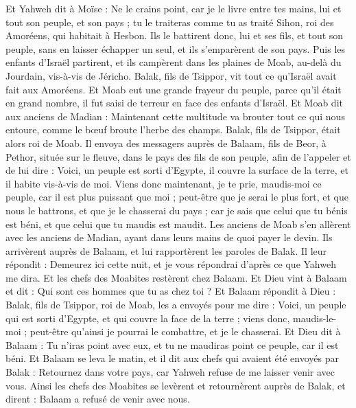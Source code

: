 \begin{multicols}{2}
Et Yahweh dit à Moïse : Ne le crains point, car je le livre entre tes mains, lui et tout son peuple, et son pays ; tu le traiteras comme tu as traité Sihon, roi des Amoréens, qui habitait à Hesbon.
Ils le battirent donc, lui et ses fils, et tout son peuple, sans en laisser échapper un seul, et ils s'emparèrent de son pays.
\VerseOne{}Puis les enfants d'Israël partirent, et ils campèrent dans les plaines de Moab, au-delà du Jourdain, vis-à-vis de Jéricho.
Balak, fils de Tsippor, vit tout ce qu'Israël avait fait aux Amoréens.
Et Moab eut une grande frayeur du peuple, parce qu'il était en grand nombre, il fut saisi de terreur en face des enfants d'Israël.
Et Moab dit aux anciens de Madian : Maintenant cette multitude va brouter tout ce qui nous entoure, comme le bœuf broute l'herbe des champs. Balak, fils de Tsippor, était alors roi de Moab.
Il envoya des messagers auprès de Balaam, fils de Beor, à Pethor, située sur le fleuve, dans le pays des fils de son peuple, afin de l'appeler et de lui dire : Voici, un peuple est sorti d'Egypte, il couvre la surface de la terre, et il habite vis-à-vis de moi.
Viens donc maintenant, je te prie, maudis-moi ce peuple, car il est plus puissant que moi ; peut-être que je serai le plus fort, et que nous le battrons, et que je le chasserai du pays ; car je sais que celui que tu bénis est béni, et que celui que tu maudis est maudit.
Les anciens de Moab s'en allèrent avec les anciens de Madian, ayant dans leurs mains de quoi payer le devin. Ils arrivèrent auprès de Balaam, et lui rapportèrent les paroles de Balak.
Il leur répondit : Demeurez ici cette nuit, et je vous répondrai d'après ce que Yahweh me dira. Et les chefs des Moabites restèrent chez Balaam.
Et Dieu vint à Balaam et dit : Qui sont ces hommes que tu as chez toi ?
Et Balaam répondit à Dieu : Balak, fils de Tsippor, roi de Moab, les a envoyés pour me dire :
Voici, un peuple qui est sorti d'Egypte, et qui couvre la face de la terre ; viens donc, maudis-le-moi ; peut-être qu'ainsi je pourrai le combattre, et je le chasserai.
Et Dieu dit à Balaam : Tu n'iras point avec eux, et tu ne maudiras point ce peuple, car il est béni.
Et Balaam se leva le matin, et il dit aux chefs qui avaient été envoyés par Balak : Retournez dans votre pays, car Yahweh refuse de me laisser venir avec vous.
Ainsi les chefs des Moabites se levèrent et retournèrent auprès de Balak, et dirent : Balaam a refusé de venir avec nous.

\end{multicols}
